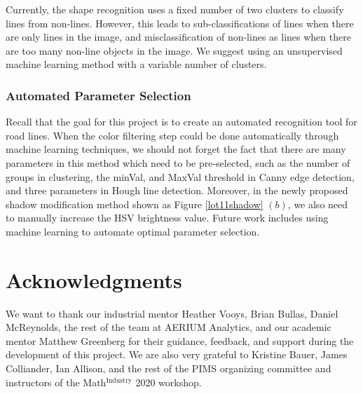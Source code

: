 \documentclass{m2pi}
\begin{document}
Currently, the shape recognition uses a fixed number of two clusters to classify lines from non-lines. However, this leads to sub-classifications of lines when there are only lines in the image, and misclassification of non-lines as lines when there are too many non-line objects in the image. We suggest using an unsupervised machine learning method with a variable number of clusters.


\subsubsection{Automated Parameter Selection}

Recall that the goal for this project is to create an automated 
recognition tool for road lines. When the color filtering step could be done 
automatically through machine learning techniques, we should not forget the fact 
that there are many parameters in this method which need to be pre-selected, 
such as the number of groups in clustering, the minVal, and MaxVal threshold 
in Canny edge detection, and three parameters in Hough line detection. 
Moreover, in the newly proposed shadow modification method shown as Figure 
\ref{lot11shadow} $(b)$, we also need to manually increase the HSV brightness 
value. Future work includes using machine learning to automate optimal parameter selection.



\section*{Acknowledgments}

We want to thank our industrial mentor Heather Vooys, Brian Bullas, Daniel McReynolds, the rest of the team at AERIUM Analytics, and our academic mentor Matthew Greenberg for their guidance, feedback, and support during the development of this project. We are also very grateful to Kristine Bauer, James Colliander, Ian Allison,  and the rest of the PIMS organizing committee and instructors of the Math$^{\text{Industry}}$ 2020 workshop.

\nocite{*}


\end{document}
